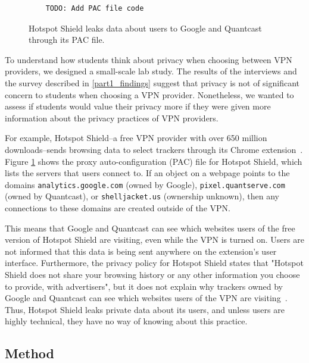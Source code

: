 
\begin{figure}
    \begin{lstlisting}
    TODO: Add PAC file code
    \end{lstlisting}
\caption{Hotspot Shield leaks data about users to Google and Quantcast through its PAC file.}
\label{fig:hotspot_pac}
\end{figure}

To understand how students think about privacy when choosing between VPN
providers, we designed a small-scale lab study.  The results of the interviews
and the survey described in \ref{part1_findings} suggest that privacy is not of
significant concern to students when choosing a VPN provider.
Nonetheless, we wanted to assess if students would value their privacy more if
they were given more information about the privacy practices of VPN providers.

For example, Hotspot Shield--a free VPN
provider with over 650 million downloads--sends browsing data to select trackers through its Chrome extension~\cite{hotspot_shield, windscribe_hotspot}. Figure \ref{fig:hotspot_pac} shows the proxy auto-configuration (PAC) file for Hotspot Shield, which lists the servers that users connect to. If an object on a webpage points to the domains \texttt{analytics.google.com} (owned by Google), \texttt{pixel.quantserve.com} (owned by Quantcast), or \texttt{shelljacket.us} (ownership unknown), then any connections to these domains are created outside of the VPN. 

This means that Google and Quantcast can see which websites users of the free version of Hotspot Shield are visiting, even while the VPN is turned on. Users are not informed that this data is being sent anywhere on the extension's user interface. Furthermore, the privacy policy for Hotspot Shield states that "Hotspot Shield does not share your browsing history or any other information you choose to provide, with advertisers", but it does not explain why trackers owned by Google and Quantcast can see which websites users of the VPN are visiting~\cite{hotspot_privacy}. Thus, Hotspot Shield leaks private data about its users, and unless users are highly technical, they have no way of knowing about this practice.

\subsection{Method}\label{sec:experiment_method}

